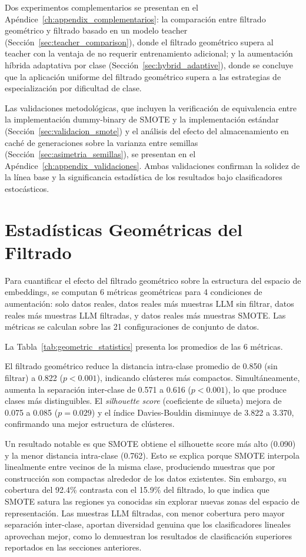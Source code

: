 Dos experimentos complementarios se presentan en el Apéndice~\ref{ch:appendix_complementarios}: la comparación entre filtrado geométrico y filtrado basado en un modelo teacher (Sección~\ref{sec:teacher_comparison}), donde el filtrado geométrico supera al teacher con la ventaja de no requerir entrenamiento adicional; y la aumentación híbrida adaptativa por clase (Sección~\ref{sec:hybrid_adaptive}), donde se concluye que la aplicación uniforme del filtrado geométrico supera a las estrategias de especialización por dificultad de clase.

Las validaciones metodológicas, que incluyen la verificación de equivalencia entre la implementación dummy-binary de SMOTE y la implementación estándar (Sección~\ref{sec:validacion_smote}) y el análisis del efecto del almacenamiento en caché de generaciones sobre la varianza entre semillas (Sección~\ref{sec:asimetria_semillas}), se presentan en el Apéndice~\ref{ch:appendix_validaciones}. Ambas validaciones confirman la solidez de la línea base y la significancia estadística de los resultados bajo clasificadores estocásticos.

\section{Estadísticas Geométricas del Filtrado}
\label{sec:geometric_statistics}

Para cuantificar el efecto del filtrado geométrico sobre la estructura del espacio de embeddings, se computan 6 métricas geométricas para 4 condiciones de aumentación: solo datos reales, datos reales más muestras LLM sin filtrar, datos reales más muestras LLM filtradas, y datos reales más muestras SMOTE. Las métricas se calculan sobre las 21 configuraciones de conjunto de datos.

La Tabla~\ref{tab:geometric_statistics} presenta los promedios de las 6 métricas.



El filtrado geométrico reduce la distancia intra-clase promedio de 0.850 (sin filtrar) a 0.822 ($p < 0.001$), indicando clústeres más compactos. Simultáneamente, aumenta la separación inter-clase de 0.571 a 0.616 ($p < 0.001$), lo que produce clases más distinguibles. El \textit{silhouette score} (coeficiente de silueta) mejora de 0.075 a 0.085 ($p = 0.029$) y el índice Davies-Bouldin disminuye de 3.822 a 3.370, confirmando una mejor estructura de clústeres.

Un resultado notable es que SMOTE obtiene el silhouette score más alto (0.090) y la menor distancia intra-clase (0.762). Esto se explica porque SMOTE interpola linealmente entre vecinos de la misma clase, produciendo muestras que por construcción son compactas alrededor de los datos existentes. Sin embargo, su cobertura del 92.4\% contrasta con el 15.9\% del filtrado, lo que indica que SMOTE satura las regiones ya conocidas sin explorar nuevas zonas del espacio de representación. Las muestras LLM filtradas, con menor cobertura pero mayor separación inter-clase, aportan diversidad genuina que los clasificadores lineales aprovechan mejor, como lo demuestran los resultados de clasificación superiores reportados en las secciones anteriores.

